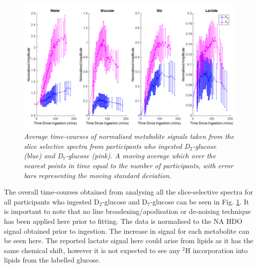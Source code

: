 \begin{figure}
    \centering
    \includegraphics[width = 1\textwidth]{Figures/Glucose/Bulk_Time.png}
    \caption{\textit{Average time-courses of normalised metabolite signals taken from the slice selective spectra from participants who ingested D$_2$-glucose (blue) and D$_7$-glucose (pink). A moving average which over the nearest points in time equal to the number of participants, with error bars representing the moving standard deviation.}}
    \label{fig:Glu:Select_Time}
\end{figure}

The overall time-courses obtained from analysing all the slice-selective spectra for all participants who ingested D$_2$-glucose and D$_7$-glucose can be seen in Fig. \ref{fig:Glu:Select_Time}. It is important to note that no line broadening/apodisation or de-noising technique has been applied here prior to fitting. The data is normalised to the \ac{NA} HDO signal obtained prior to ingestion. The increase in signal for each metabolite can be seen here. The reported lactate signal here could arise from lipids as it has the same chemical shift, however it is not expected to see any $^2$H incorporation into lipids from the labelled glucose.  

